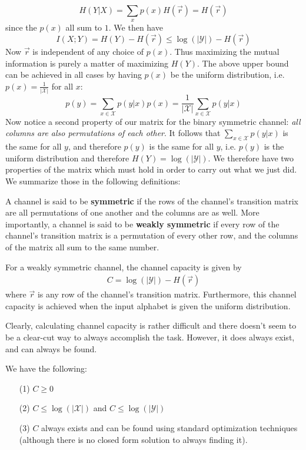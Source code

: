\[ H(Y|X) = \sum_x p(x)H(\vec{r}) = H(\vec{r}) \]
since the $p(x)$ all sum to $1$. We then have 
\[ I(X;Y) = H(Y) - H(\vec{r}) \leq \log(|\mathcal{Y}|) - H(\vec{r}) \]
Now $\vec{r}$ is independent of any choice of $p(x)$. Thus maximizing the mutual information is purely a matter of maximizing $H(Y)$. The above upper bound can be achieved in all cases by having $p(x)$ be the uniform distribution, i.e. $p(x) = \frac{1}{|\mathcal{X}|}$ for all $x$:
\[ p(y) = \sum_{x \in \mathcal{X}} p(y|x)p(x) = \frac{1}{|\mathcal{X}|}\sum_{x \in \mathcal{X}}p(y|x) \]
Now notice a second property of our matrix for the binary symmetric channel: \emph{all columns are also permutations of each other}. It follows that $\sum_{x \in \mathcal{X}}p(y|x)$ is the same for all $y$, and therefore $p(y)$ is the same for all $y$, i.e. $p(y)$ is the uniform distribution and therefore $H(Y) = \log(|\mathcal{Y}|)$. We therefore have two properties of the matrix which must hold in order to carry out what we just did. We summarize those in the following definitions:
\begin{definition}
	A channel is said to be \textbf{symmetric} if the rows of the channel's transition matrix are all permutations of one another and the columns are as well. More importantly, a channel is said to be \textbf{weakly symmetric} if every row of the channel's transition matrix is a permutation of every other row, and the columns of the matrix all sum to the same number.  
\end{definition}
\begin{theorem}
	For a weakly symmetric channel, the channel capacity is given by 
	\begin{align}
		C = \log(|\mathcal{Y}|) - H(\vec{r})
	\end{align}
	where $\vec{r}$ is any row of the channel's transition matrix. Furthermore, this channel capacity is achieved when the input alphabet is given the uniform distribution. 
\end{theorem}
Clearly, calculating channel capacity is rather difficult and there doesn't seem to be a clear-cut way to always accomplish the task. However, it does always exist, and can always be found. 
\begin{theorem}
We have the following:
	\begin{itemize}
		\item[(1)] $C \geq 0$
		\item[(2)] $C \leq \log(|\mathcal{X}|)$ and $C \leq \log(|\mathcal{Y}|)$
		\item[(3)] $C$ always exists and can be found using standard optimization techniques (although there is no closed form solution to always finding it). 
	\end{itemize}
\end{theorem} 
